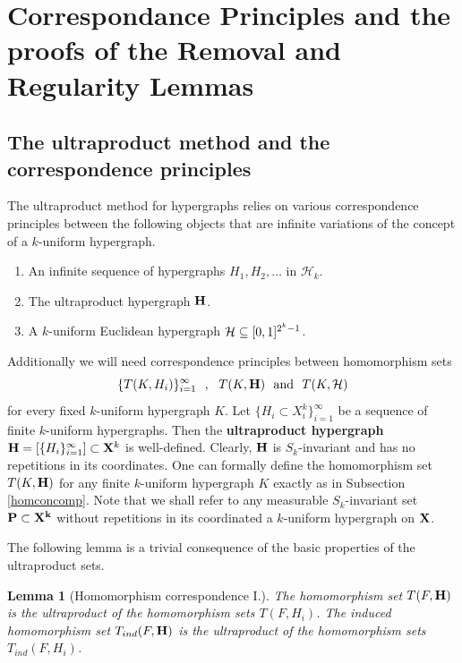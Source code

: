 \documentclass [11pt] {article}
\newtheorem{lemma}{Lemma}[section]
\def\bH{{\bf H}}
\def\cH{\mbox{$\cal H$}}
\def\xo{{\bf X}}
\begin{document}
\section{Correspondance Principles and the proofs of the Removal and
 Regularity Lemmas}
\subsection{The ultraproduct method and the correspondence principles}

The ultraproduct method for hypergraphs relies on various correspondence
principles between the following objects that are infinite variations of
 the concept of a $k$-uniform hypergraph.

\begin{enumerate}

\item An infinite sequence of hypergraphs $H_1,H_2,\dots$ in $\mathcal{H}_k$.
\item The ultraproduct hypergraph ${\bf H}$.
\item A $k$-uniform Euclidean hypergraph $\cH\subseteq [0,1]^{2^k-1}$.

\end{enumerate}

Additionally we will need correspondence principles between homomorphism sets
$$\{T(K,H_i)\}_{i=1}^\infty~~,~~T(K,\bH)~~{\rm and}~~T(K,\cH)$$
for every fixed $k$-uniform hypergraph $K$.
Let $\{H_i\subset X_i^k\}^\infty_{i=1}$ be a sequence
of finite $k$-uniform hypergraphs. Then
the {\bf ultraproduct hypergraph} $\bH=[\{H_i\}^\infty_{i=1}]\subset
\xo^k$ is well-defined. Clearly, $\bH$ is $S_k$-invariant and has no
repetitions in its coordinates.
One can formally define the homomorphism set $T(K,\bH)$ for
any finite $k$-uniform hypergraph $K$ exactly as in Subsection
\ref{homconcomp}. Note that we shall refer to any measurable $S_k$-invariant
set ${\bf P\subset \xo^k}$ without repetitions in its coordinated
a $k$-uniform hypergraph on $\xo$.

The following lemma is a trivial consequence of
the basic properties of the ultraproduct sets.

\begin{lemma}[Homomorphism correspondence I.]\label{homcor1} The
  homomorphism set $T(F,{\bf H})$ is the ultraproduct of the
homomorphism sets $T(F,H_i)$. The
induced  homomorphism set $T_{ind}(F,{\bf H})$ is the ultraproduct of the
homomorphism sets $T_{ind}(F,H_i)$.
\end{lemma}
\end{document}
